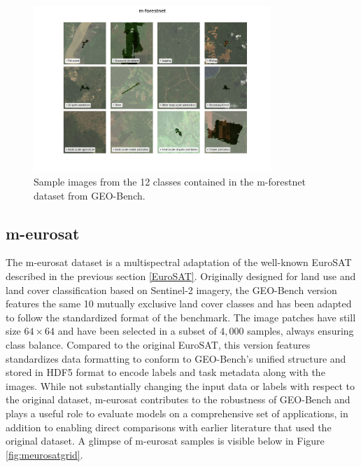 \documentclass[a4paper, oneside, english]{sapthesis} %
\begin{document}
\vspace{0.3cm}

\begin{figure}[h]
    \centering
    \includegraphics[width=0.8\textwidth]{img/m-forestnet_image_grid.png}
    \caption{\normalsize Sample images from the 12 classes contained in the m-forestnet dataset from GEO-Bench.}
    \label{fig:forestnetgrid}
\end{figure}


\subsection{m-eurosat}

The m-eurosat dataset is a multispectral adaptation of the well-known EuroSAT \cite{helber2019eurosat} described in the previous section \ref{EuroSAT}. Originally designed for land use and land cover classification based on Sentinel-2 imagery, the GEO-Bench version features the same 10 mutually exclusive land cover classes and has been adapted to follow the standardized format of the benchmark. The image patches have still size $64 \times 64$ and have been selected in a subset of $4,000$ samples, always ensuring class balance. Compared to the original EuroSAT, this version features standardizes data formatting to conform to GEO-Bench's unified structure and stored in HDF5 format to encode labels and task metadata along with the images. While not substantially changing the input data or labels with respect to the original dataset, m-eurosat contributes to the robustness of GEO-Bench and plays a useful role to evaluate models on a comprehensive set of applications, in addition to enabling direct comparisons with earlier literature that used the original dataset. A glimpse of m-eurosat samples is visible below in Figure \ref{fig:meurosatgrid}.
\end{document}
